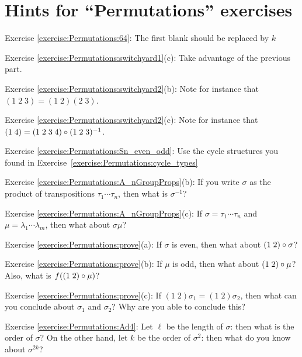 \section{Hints for ``Permutations'' exercises}
\label{sec:Permutations:Hints} 

\noindent Exercise \ref{exercise:Permutations:64}: The first blank should be replaced by $k$

\noindent Exercise \ref{exercise:Permutations:switchyard1}(c): Take advantage of the previous part.

\noindent Exercise \ref{exercise:Permutations:switchyard2}(b): Note for instance that $(1 \;2 \; 3) = (1 \; 2) (2 \; 3)$.

\noindent Exercise \ref{exercise:Permutations:switchyard2}(c): Note for instance that $(1 \;4 ) = (1 \; 2 \; 3 \; 4) \circ (1 \; 2 \; 3 )^{-1}$.

\noindent Exercise \ref{exercise:Permutations:Sn_even_odd}: Use the cycle structures you found in Exercise~\ref{exercise:Permutations:cycle_types}


\noindent Exercise \ref{exercise:Permutations:A_nGroupProps}(b): If you write $\sigma$ as the product of transpositions $\tau_1 \cdots \tau_{n}$, then what is $\sigma^{-1}$?

\noindent Exercise \ref{exercise:Permutations:A_nGroupProps}(c): If $\sigma = \tau_1 \cdots \tau_{n}$ and $\mu = \lambda_1 \cdots \lambda_{m}$, then what about $\sigma \mu$?

\noindent Exercise \ref{exercise:Permutations:prove}(a): If $\sigma$ is even, then what about $(1 \; 2) \circ \sigma$?

\noindent Exercise \ref{exercise:Permutations:prove}(b): If $\mu$ is odd, then what about $(1 \; 2) \circ \mu$? Also, what is $f( (1 \; 2) \circ \mu )$?

\noindent Exercise \ref{exercise:Permutations:prove}(c): If $(1 \; 2) \sigma_1 = (1 \; 2) \sigma_2$, then what can you conclude about $\sigma_1$ and $\sigma_2$? Why are you able to conclude this?


\noindent Exercise \ref{exercise:Permutations:Ad4}: Let $\ell$ be the length of $\sigma$: then what is the order of $\sigma$? On the other hand, let $k$ be the order of $\sigma^2$: then what do you know about $\sigma^{2k}$?


\bigskip

